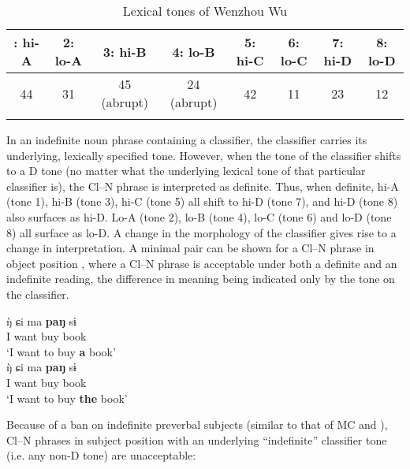 \documentclass[output=paper
,modfonts
,nonflat]{langsci/langscibook}
\begin{document}
\begin{table}[h] \small
\caption{Lexical tones of Wenzhou Wu\label{tab:Hall:ToneV}}
\begin{tabularx}{\textwidth}{cccccccc}
\lsptoprule
1: hi-A&2: lo-A&3: hi-B&4: lo-B&5: hi-C&6: lo-C&7: hi-D&8: lo-D\\
\midrule
44&31&45 (abrupt)&24 (abrupt)&42&11&23&12\\
\lspbottomrule
\end{tabularx}
\end{table}

In an indefinite noun phrase containing a classifier, the classifier carries its underlying, lexically specified tone. However, when the tone of the classifier shifts to a D tone (no matter what the underlying lexical tone of that particular classifier is), the Cl--N phrase is interpreted as definite. Thus, when definite, hi-A (tone 1), hi-B (tone 3), hi-C (tone 5) all shift to hi-D (tone 7), and hi-D (tone 8) also surfaces as hi-D. Lo-A (tone 2), lo-B (tone 4), lo-C (tone 6) and lo-D (tone 8) all surface as lo-D. A change in the morphology of the classifier gives rise to a change in interpretation. A minimal pair can be shown for a Cl--N phrase in object position , where a Cl--N phrase is acceptable under both a definite and an indefinite reading, the difference in meaning being indicated only by the tone on the classifier.\largerpage

\ea \label{ex:hall:21}
\ea
\gll 
{\`ŋ} ɕi ma \textbf{paŋ} sɨ\\
I want buy {} book\\
\glt
`I want to buy \textbf{a} book'\\
\ex
\gll
{\`ŋ} ɕi ma \textbf{paŋ} sɨ\\
I want buy {} book\\
\glt
`I want to buy \textbf{the} book'\\
\z
\z

Because of a ban on indefinite preverbal subjects (similar to that of MC and ), Cl--N phrases in subject position with an underlying ``indefinite'' classifier tone (i.e. any non-D tone) are unacceptable:

\ea \label{ex:hall:22}
\z 
\z 
\end{document}

